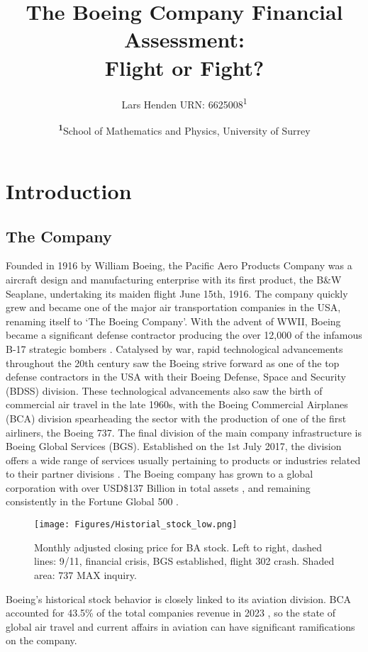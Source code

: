 \documentclass[
	a4paper, %
	11pt, %
	twoside, %
]{LTJournalArticle}
\title{The Boeing Company Financial Assessment: \\ Flight or Fight?}
\author{%
	Lars Henden URN: 6625008\textsuperscript{1}
}
\date{\footnotesize\textsuperscript{\textbf{1}}School of Mathematics and Physics, University of Surrey}
\begin{document}
\maketitle %

\section{Introduction}
\subsection{The Company}
Founded in 1916 by William Boeing, the Pacific Aero Products Company was a aircraft design and manufacturing enterprise with its first product, the B\&W Seaplane, undertaking its maiden flight June 15th, 1916.
The company quickly grew and became one of the major air transportation companies in the USA, renaming itself to `The Boeing Company'.
With the advent of WWII, Boeing became a significant defense contractor producing the over 12,000 of the infamous B-17 strategic bombers \cite{Story_boeing}.
Catalysed by war, rapid technological advancements throughout the 20th century saw the Boeing strive forward as one of the top defense contractors in the USA with their Boeing Defense, Space and Security (BDSS) division.
These technological advancements also saw the birth of commercial air travel in the late 1960s, with the Boeing Commercial Airplanes (BCA) division spearheading the sector with the production of one of the first airliners, the Boeing 737.
The final division of the main company infrastructure is Boeing Global Services (BGS).
Established on the 1st July 2017, the division offers a wide range of services usually pertaining to products or industries related to their partner divisions \cite{Boeing_WEBSITE}.
The Boeing company has grown to a global corporation with over USD\$137 Billion in total assets \cite{Boeing_finance_report}, and remaining consistently in the Fortune Global 500 \cite{Fortune_500}.
\begin{figure}
	\texttt{[image: Figures/Historial\_stock\_low.png]}
	\caption{Monthly adjusted closing price for BA stock. Left to right, dashed lines: 9/11, financial crisis, BGS established, flight 302 crash. Shaded area: 737 MAX inquiry.}
	\label{fig:StockHist}
\end{figure}
Boeing's historical stock behavior is closely linked to its aviation division.
BCA accounted for 43.5\% of the total companies revenue in 2023 \cite{Boeing_finance_report}, so the state of global air travel and current affairs in aviation can have significant ramifications on the company.
\end{document}
